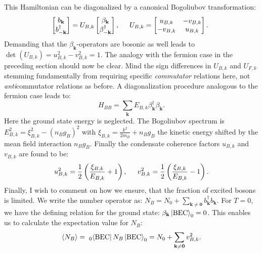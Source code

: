 This Hamiltonian can be diagonalized by a canonical Bogoliubov transformation:
\begin{equation}
\begin{bmatrix} b_\mathbf{k} \\ b^\dagger_{-\mathbf{k}} \end{bmatrix} = U_{B,k} \begin{bmatrix} \beta_\mathbf{k} \\ \beta^\dagger_{-\mathbf{k}}\end{bmatrix}, \hspace{0.5cm} U_{B,k} = \begin{bmatrix} u_{B,k} & -v_{B,k} \\ -v_{B,k} & u_{B,k} \end{bmatrix}. 
\end{equation}
Demanding that the $\beta_\mathbf{k}$-operators are bosonic as well leads to $\det(U_{B,k}) = u_{B,k}^2-v_{B,k}^2=1$. The analogy with the fermion case in the preceding section should now be clear. Mind the sign differences in $U_{B,k}$ and $U_{F,k}$ stemming fundamentally from requiring specific \textit{commutator} relations here, not \textit{anti}commutator relations as before. A diagonalization procedure analogous to the fermion case leads to: 
\begin{equation}
H_{BB} = \sum_\mathbf{k} E_{B,k} \beta_\mathbf{k}^\dagger \beta_\mathbf{k}. 
\end{equation}
Here the ground state energy is neglected. The Bogoliubov spectrum is $E_{B,k}^2 = \xi_{B,k}^2-(n_Bg_B)^2$ with $\xi_{B,k} = \frac{k^2}{2m_B}+n_Bg_B$ the kinetic energy shifted by the mean field interaction $n_Bg_B$. Finally the condensate coherence factors $u_{B,k}$ and $v_{B,k}$ are found to be: 
\begin{equation}
u_{B,k}^2 = \frac{1}{2}\left(\frac{\xi_{B,k}}{ E_{B,k}}+1 \right), \hspace{0.5cm} v_{B,k}^2 = \frac{1}{2}\left(\frac{\xi_{B,k}}{ E_{B,k}}-1 \right).
\end{equation}
Finally, I wish to comment on how we ensure, that the fraction of excited bosons is limited. We write the number operator as: $N_B = N_0 + \sum_{\mathbf{k}\neq \mathbf{0}} b^\dagger_{\mathbf{k}}b_{\mathbf{k}}$. For $T=0$, we have the defining relation for the ground state: $\beta_{\mathbf{k}}\ket{\text{BEC}}_0 = 0$. This enables us to calculate the expectation value for $N_B$:
\begin{equation}
\braket{N_B} =\;_{0}\!\bra{\text{BEC}} N_B \ket{\text{BEC}}_0 = N_0 + \sum_{\mathbf{k}\neq \mathbf{0}} v^2_{B,k}.\nonumber
\end{equation} 
